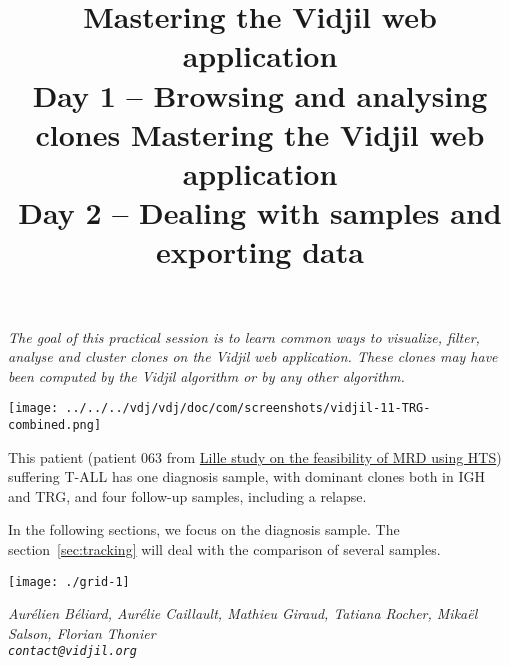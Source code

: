 \documentclass[11pt]{article}
\title{Mastering the Vidjil web application \\[1ex] Day 1 -- Browsing and analysing clones
}
\begin{document}
\maketitle

\textit{The goal of this practical session is to learn
common ways to visualize, filter, analyse and cluster clones
on the Vidjil web application.
%
These clones may have been computed by the Vidjil algorithm
or by any other algorithm.}

\bigskip


\centerline{\texttt{[image: ../../../vdj/vdj/doc/com/screenshots/vidjil-11-TRG-combined.png]}}

\bigskip



This patient (patient 063 from \href{http://dx.doi.org/10.1016/j.leukres.2016.11com.009}{Lille study on the feasibility of MRD using HTS}) suffering T-ALL has one diagnosis sample,
with dominant clones both in IGH and TRG,
and four follow-up samples, including a relapse.


In the following sections, we focus on the diagnosis sample.
The section~\ref{sec:tracking} will deal with the comparison of several samples. 







\bigskip

\bigskip

\centerline{\texttt{[image: ./grid-1]}}

\newpage

\title{Mastering the Vidjil web application \\[1ex] Day 2 -- Dealing with
  samples and exporting data
}
\maketitle






\vfill
\flushright \it Aurélien Béliard, Aurélie Caillault, Mathieu Giraud, Tatiana Rocher, Mikaël Salson, Florian Thonier
\\ \texttt{contact@vidjil.org}
\end{document}
